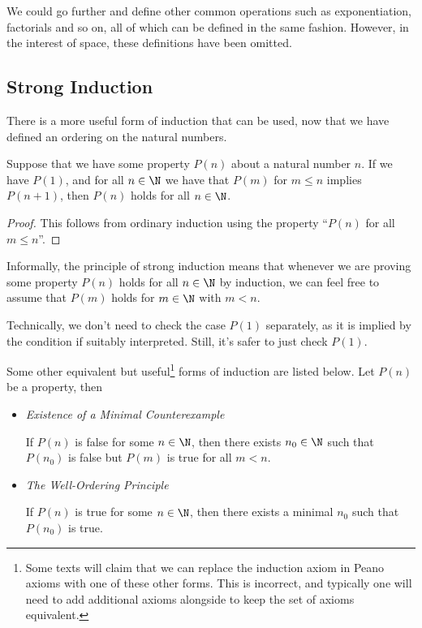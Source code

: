 We could go further and define other common operations such as exponentiation, factorials and so on, all of which can be defined in the same fashion. However, in the interest of space, these definitions have been omitted.

\subsection{Strong Induction}

There is a more useful form of induction that can be used, now that we have defined an ordering on the natural numbers.

\begin{proposition}
	Suppose that we have some property $P(n)$ about a natural number $n$. If we have $P(1)$, and for all $n \in \N$ we have that $P(m)$ for $m \leq n$ implies $P(n + 1)$, then $P(n)$ holds for all $n \in \N$.
\end{proposition}
\begin{proof}
	This follows from ordinary induction using the property ``$P(n)$ for all $m \leq n$''.
\end{proof}

Informally, the principle of strong induction means that whenever we are proving some property $P(n)$ holds for all $n \in \N$ by induction, we can feel free to assume that $P(m)$ holds for $m \in \N$ with $m < n$.

\begin{remark}
	Technically, we don't need to check the case $P(1)$ separately, as it is implied by the condition if suitably interpreted. Still, it's safer to just check $P(1)$.
\end{remark}


Some other equivalent but useful\footnote{Some texts will claim that we can replace the induction axiom in Peano axioms with one of these other forms. This is incorrect, and typically one will need to add additional axioms alongside to keep the set of axioms equivalent.} forms of induction are listed below. Let $P(n)$ be a property, then
\begin{itemize}
	\item \emph{Existence of a Minimal Counterexample}
	
	If $P(n)$ is false for some $n \in \N$, then there exists $n_0 \in \N$ such that $P(n_0)$ is false but $P(m)$ is true for all $m < n$.

	\item \emph{The Well-Ordering Principle}
	
	If $P(n)$ is true for some $n \in \N$, then there exists a minimal $n_0$ such that $P(n_0)$ is true.
\end{itemize}

